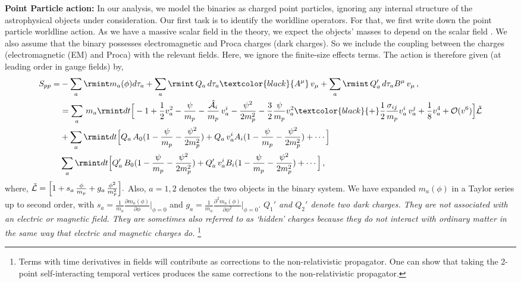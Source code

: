 \textbf{Point Particle action:} In our analysis, we model the binaries as charged point particles, ignoring any internal structure of the astrophysical objects under consideration. Our first task is to identify the worldline operators. For that, we first write down the point particle worldline action. As we have a massive scalar field in the theory, we expect the objects' masses to depend on the scalar field \cite{Dyadina:2018ryl}. We also assume that the binary possesses electromagnetic and Proca charges (dark charges). So we include the coupling between the charges (electromagnetic (EM) and Proca) with the relevant fields. Here, we ignore the finite-size effects terms. %
The action is therefore given (at leading order in gauge fields) by,
\begin{align}
    \begin{split}
        S_{pp}=&-\sum_{a}\rmint m_a(\phi)d\tau_{a}+\sum_a\rmint\,Q_a \,d\tau_a \textcolor{black}{A^\mu}\,v_\mu+\sum_a\rmint\,Q_a'\, d\tau_a B^\mu\,v_\mu \,,\\ &
        =\sum_{a}\, m_a\rmint dt\Big[-1+\frac{1}{2}v_a^2-\frac{\psi}{m_{p}}-\frac{\hat{\mathcal{A}}_{i}}{m_{p}}\,v^i_{a}-\frac{\psi^2}{2m_{p}^2}-\frac{3}{2}\frac{\psi}{m_{p}} v_{a}^2\textcolor{black}{+}\frac{1}{2}\frac{\sigma_{ij}}{m_{p}}v^{i}_a\,v^{j}_a+\frac{1}{8}v_a^4+\mathcal{O}(v^6)\Big]\Tilde{\mathcal{L}} \\ &
        +\sum_a \rmint dt \Big[Q_a\,A_{0}(1-\frac{\psi}{m_{p}}-\frac{\psi^2}{2m_{p}^2}) +Q_a\,v^{i}_a A_{i}(1-\frac{\psi}{m_{p}}-\frac{\psi^2}{2m_p^2})+\cdots\Big]\\ &
        \sum_a \rmint dt \Big[Q_a'\,B_{0}(1-\frac{\psi}{m_{p}}-\frac{\psi^2}{2m_{p}^2}) +Q_a'\,v^{i}_a B_{i}(1-\frac{\psi}{m_{p}}-\frac{\psi^2}{2m_p^2})+\cdots\Big]\,, \label{4.10}
    \end{split}
 \end{align}
 where, $\Tilde{\mathcal{L}}=\Big[1+s_a\,\frac{\phi}{m_{p}}+g_a\,\frac{\phi^2}{m_{p}^2}\Big].$ Also, $a=1,2$ denotes the two objects in the binary system. We have expanded $m_a(\phi)$ in a Taylor series up to second order, with $s_a=\frac{1}{m_a}\frac{\partial m_a(\phi)}{\partial \phi}|_{\phi=0}$ and $g_a=\frac{1}{m_a}\frac{\partial^2 m_a(\phi)}{\partial \phi^2}|_{\phi=0} $. \textit{ $Q_1'$ and $Q_2'$ denote two dark charges. They are not associated with an electric or magnetic field. They are sometimes also referred to as `hidden' charges because they do not interact with ordinary matter in the same way that electric and magnetic charges do.}
\footnote{Terms with time derivatives in fields will contribute as corrections to the non-relativistic propagator.  One can show that taking the 2-point self-interacting temporal vertices produces the same corrections to the non-relativistic propagator. 
}



